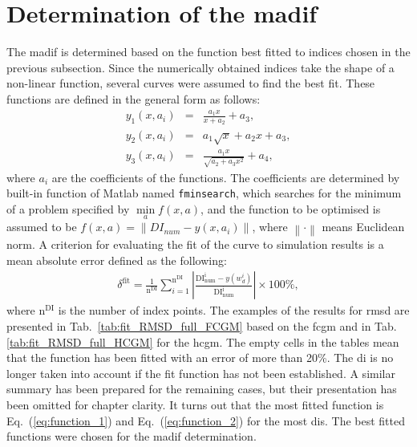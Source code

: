 \section{Determination of the \acs{madif}}
\label{sec:determination}

The \ac{madif} is determined based on the function best fitted to indices chosen in the previous subsection.
Since the numerically obtained indices take the shape of a non-linear function, several curves were assumed to find the best fit.
These functions are defined in the general form as follows:
\begin{eqnarray}
	y_1(x,a_i) & = & \frac{a_1x}{x+a_2}+a_3,
	\label{eq:function_1}\\
	y_2(x,a_i) & = & a_1\sqrt{x} + a_2x+a_3,
	\label{eq:function_2}\\
	y_3(x,a_i) & = & \frac{a_1x}{\sqrt{a_2 + a_3x^2}}+a_4,\label{eq:function_3} 
\end{eqnarray}
where \(a_i\) are the coefficients of the functions.
The coefficients are determined by built-in function of Matlab named \verb+fminsearch+, which searches for the minimum of a problem specified by \(\min\limits_a f(x,a)\), and the function to be optimised is assumed to be \(f(x,a)=\left\|DI_{num} - y(x,a_i)\right\|\), where \(\left\|\cdot\right\|\) means Euclidean norm.
A criterion for evaluating the fit of the curve to simulation results is a mean absolute error defined as the following:
\begin{eqnarray}
	\delta^{\mathrm{fit}} = \frac{1}{\mathrm{n^{DI}}}\sum_{i=1}^{\mathrm{n^{DI}}} \left|\frac{\mathrm{DI^i_{num}}-y(w_d^i)}{\mathrm{DI^i_{num}}}\right|\times100\%,
\end{eqnarray}
where \(\mathrm{n^{DI}}\) is the number of index points.
The examples of the results for \ac{rmsd} are presented in Tab.~\ref{tab:fit_RMSD_full_FCGM} based on the \ac{fcgm} and in Tab. \ref{tab:fit_RMSD_full_HCGM} for the \ac{hcgm}.
The empty cells in the tables mean that the function has been fitted with an error of more than 20\%.
The \ac{di} is no longer taken into account if the fit function has not been established.
A similar summary has been prepared for the remaining cases, but their presentation has been omitted for chapter clarity.
It turns out that the most fitted function is Eq.~(\ref{eq:function_1}) and Eq.~(\ref{eq:function_2}) for the most \acp{di}.
The best fitted functions were chosen for the \ac{madif} determination.

